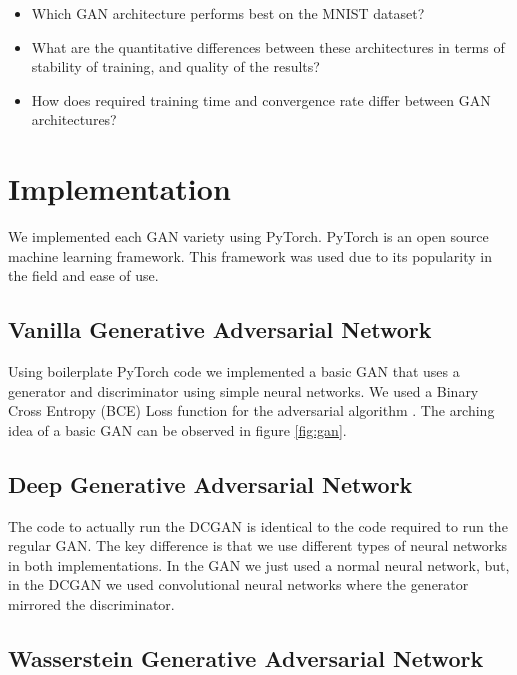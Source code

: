 \documentclass[12pt,
 reprint,
 amsmath,amssymb,
 aps,
]{revtex4-2}
\begin{document}
\begin{itemize}
    \item Which GAN architecture performs best on the MNIST dataset?
    \item What are the quantitative differences between these architectures in terms of stability of training, and quality of the results? 
    \item How does required training time and convergence rate differ between GAN architectures?
\end{itemize}


\section{\label{sec:implementation}Implementation}

We implemented each GAN variety using PyTorch. PyTorch is an open source machine learning framework. This framework was used due to its popularity in the field and ease of use\cite{pytorch}. 


\subsection{\label{sec:impVanilla}Vanilla Generative Adversarial Network}

Using boilerplate PyTorch code we implemented a basic GAN that uses a generator and discriminator using simple neural networks. We used a Binary Cross Entropy (BCE) Loss function for the adversarial algorithm \cite{generalDeepLearning}. 
The arching idea of a basic GAN can be observed in figure \ref{fig:gan}.


\subsection{\label{sec:impDCGAN}Deep Generative Adversarial Network}

The code to actually run the DCGAN is identical to the code required to run the regular GAN. The key difference is that we use different types of neural networks in both implementations. In the GAN we just used a normal neural network, but, in the DCGAN we used convolutional neural networks where the generator mirrored the discriminator.


\subsection{\label{sec:impWGAN}Wasserstein Generative Adversarial Network}
\end{document}
